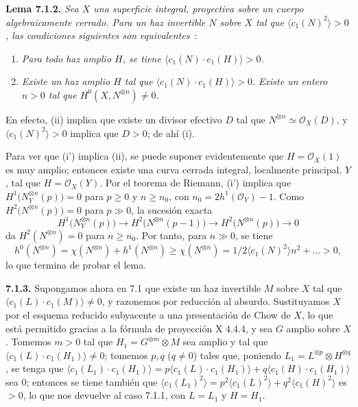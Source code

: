 \textbf{Lema 7.1.2.} \emph{Sea $X$ una superficie integral, proyectiva sobre un cuerpo algebraicamente cerrado. Para un haz invertible $N$ sobre $X$ tal que $\langle c_1(N)^2\rangle>0$, las condiciones siguientes son equivalentes}~:
\begin{enumerate}[label=(\roman*)]
\item \emph{Para todo haz amplio $H$, se tiene $\langle c_1(N)\cdot c_1(H)\rangle>0$.}
\item[(i')] \emph{Existe un haz amplio $H$ tal que $\langle c_1(N)\cdot c_1(H)\rangle>0$.}
\sisi{\item}{\item[(ii)]} \emph{Existe un entero $n>0$ tal que $H^0(X,N^{\otimes n})\ne0$.} %
\end{enumerate}
En efecto, (ii) implica que existe un divisor efectivo $D$ tal que $N^{\otimes n}\simeq\mathcal O_X(D)$, y $\langle c_1(N)^2\rangle>0$ implica que $D>0$; de ahí (i).

Para ver que (i') implica (ii), se puede suponer evidentemente que $H=\mathcal O_X(1)$ es muy amplio; entonces existe una curva cerrada integral, localmente principal, $Y$, tal que $H=\mathcal O_X(Y)$. Por el teorema de Riemann, (i') implica que $H^1\bigl(N_Y^{\otimes n}(p)\bigr)=0$ para $p\geq0$ y $n\geq n_0$, con $n_0=2h^1(\mathcal O_Y)-1$. Como $H^2\bigl(N^{\otimes n}(p)\bigr)=0$ para $p\gg0$, la sucesión exacta
\[
   H^1\bigl(N_Y^{\otimes n}(p)\bigr)
   \longrightarrow H^2\bigl(N^{\otimes n}(p-1)\bigr)
   \longrightarrow H^2\bigl(N^{\otimes n}(p)\bigr)
   \longrightarrow0
\]
da $H^2(N^{\otimes n})=0$ para $n\geq n_0$. Por tanto, para $n\gg0$, se tiene
\[
   h^0(N^{\otimes n})
   =\chi(N^{\otimes n})+h^1(N^{\otimes n})
   \geq\chi(N^{\otimes n})
   =1/2\langle c_1(N)^2\rangle n^2+\ldots>0,
\]
lo que termina de probar el lema.

\textbf{7.1.3.} Supongamos ahora en 7.1 que existe un haz invertible $M$ sobre $X$ tal que $\langle c_1(L)\cdot c_1(M)\rangle\ne0$, y razonemos por reducción al absurdo. Sustituyamos $X$ por el esquema reducido subyacente a una presentación de Chow de $X$, lo que está permitido gracias a la fórmula de proyección X 4.4.4, y sea $G$ amplio sobre $X$. Tomemos $m>0$ tal que $H_1=G^{\otimes m}\otimes M$ sea amplio y tal que $\langle c_1(L)\cdot c_1(H_1)\rangle\ne0$; tomemos $p,q$ ($q\ne0$) tales que, poniendo $L_1=L^{\otimes p}\otimes H^{\otimes q}$, se tenga que $\langle c_1(L_1)\cdot c_1(H_1)\rangle=p\langle c_1(L)\cdot c_1(H_1)\rangle+q\langle c_1(H)\cdot c_1(H_1)\rangle$ sea $0$; entonces se tiene también que $\langle c_1(L_1)^2\rangle=p^2\langle c_1(L)^2\rangle+q^2\langle c_1(H)^2\rangle$ es $>0$, lo que nos devuelve al caso 7.1.1, con $L=L_1$ y $H=H_1$.

